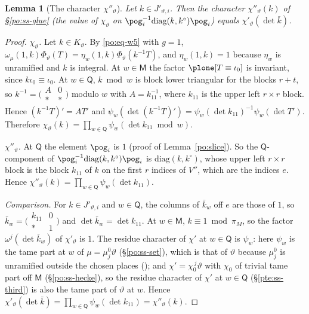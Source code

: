 \documentclass[10pt]{amsart}
\newtheorem{lemma}[theorem]{Lemma}
\theoremstyle{definition}
\theoremstyle{remark}
\begin{document}
\begin{lemma}[The character $\chi''_\vartheta$]\label{ptf:chi}
Let $k\in J'_{\vartheta,i}$. Then the character $\chi''_\vartheta(k)$ of \S\ref{po:ss-glue} (the value of $\chi_\vartheta$ on
$\pog_i^{-1}\mathrm{diag}(k,k^\circ)\pog_i$) equals $\chi'_\vartheta(\det\bar k)$.
\end{lemma}
\begin{proof}
\emph{$\chi_\vartheta$.} Let $k\in K_\vartheta$. By \eqref{po:eq-w5} with $g=1$, $\omega_\mu(1,k)\Phi_\vartheta(T)=\eta_w(1,k)\Phi_\vartheta(k^{-1}T)$,
and $\eta_w(1,k)=1$ because $\eta_w$ is unramified and $k$ is integral. At $w\in\mathsf M$ the factor
$\plone[T\equiv\iota_0]$ is invariant, since $k\iota_0\equiv\iota_0$. At $w\in\mathsf Q$, $k\bmod w$ is block lower
triangular for the blocks $r+t$, so $k^{-1}=\bigl(\begin{smallmatrix}A&0\\ *&*\end{smallmatrix}\bigr)$ modulo $w$ with
$A=k_{11}^{-1}$, where $k_{11}$ is the upper left $r\times r$ block. Hence $(k^{-1}T)'=AT'$ and
$\psi_w(\det(k^{-1}T)')=\psi_w(\det k_{11})^{-1}\psi_w(\det T')$. Therefore
$\chi_\vartheta(k)=\prod_{w\in\mathsf Q}\psi_w(\det k_{11}\bmod w)$.

\emph{$\chi''_\vartheta$.} At $\mathsf Q$ the element $\pog_i$ is $1$ (proof of Lemma~\ref{po:slice}). So the $\mathsf Q$-component of
$\pog_i^{-1}\mathrm{diag}(k,k^\circ)\pog_i$ is $\mathrm{diag}(k,k^\circ)$, whose upper left $r\times r$ block is the block $k_{11}$
of $k$ on the first $r$ indices of $V''$, which are the indices $e$. Hence $\chi''_\vartheta(k)=\prod_{w\in\mathsf Q}\psi_w(\det
k_{11})$.

\emph{Comparison.} For $k\in J'_{\vartheta,i}$ and $w\in\mathsf Q$, the columns of $\bar k_w$ off $e$ are those of $1$, so
$\bar k_w=\bigl(\begin{smallmatrix}k_{11}&0\\ *&1\end{smallmatrix}\bigr)$ and $\det\bar k_w=\det k_{11}$. At $w\in\mathsf M$,
$k\equiv1\bmod\pi_M$, so the factor $\omega^j(\det\bar k_w)$ of $\chi'_\vartheta$ is $1$. The residue character of $\chi'$ at
$w\in\mathsf Q$ is $\psi_w$: here $\psi_w$ is the tame part at $w$ of $\mu=\mu^0_j\vartheta$ (\S\ref{po:ss-set}), which is
that of $\vartheta$ because $\mu^0_j$ is unramified outside the chosen places ({\cite[\S14.3]{P46}}); and
$\chi'=\chi_0^{\,j}\vartheta$ with $\chi_0$ of trivial tame part off $\mathsf M$ (\S\ref{po:ss-hecke}), so the residue
character of $\chi'$ at $w\in\mathsf Q$ (\S\ref{pte:ss-third}) is also the tame part of $\vartheta$ at $w$. Hence $\chi'_\vartheta(\det\bar k)=\prod_{w\in\mathsf Q}\psi_w(\det k_{11})=
\chi''_\vartheta(k)$.
\end{proof}
\end{document}
